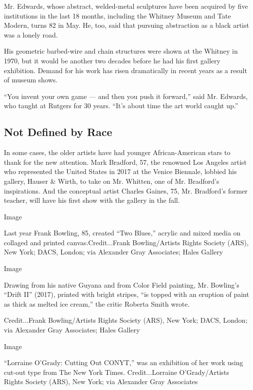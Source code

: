 Mr. Edwards, whose abstract, welded-metal sculptures have been acquired
by five institutions in the last 18 months, including the Whitney Museum
and Tate Modern, turns 82 in May. He, too, said that pursuing
abstraction as a black artist was a lonely road.

His geometric barbed-wire and chain structures were shown at the Whitney
in 1970, but it would be another two decades before he had his first
gallery exhibition. Demand for his work has risen dramatically in recent
years as a result of museum shows.

``You invent your own game --- and then you push it forward,'' said Mr.
Edwards, who taught at Rutgers for 30 years. ``It's about time the art
world caught up.''

\hypertarget{not-defined-by-race}{%
\subsection{Not Defined by Race}\label{not-defined-by-race}}

In some cases, the older artists have had younger African-American stars
to thank for the new attention. Mark Bradford, 57, the renowned Los
Angeles artist who represented the United States in 2017 at the Venice
Biennale, lobbied his gallery, Hauser \& Wirth, to take on Mr. Whitten,
one of Mr. Bradford's inspirations. And the conceptual artist Charles
Gaines, 75, Mr. Bradford's former teacher, will have his first show with
the gallery in the fall.

Image

Last year Frank Bowling, 85, created ``Two Blues,'' acrylic and mixed
media on collaged and printed canvas.Credit...Frank Bowling/Artists
Rights Society (ARS), New York; DACS, London; via Alexander Gray
Associates; Hales Gallery

Image

Drawing from his native Guyana and from Color Field painting, Mr.
Bowling's ``Drift II'' (2017), printed with bright stripes, ``is topped
with an eruption of paint as thick as melted ice cream,'' the critic
Roberta Smith wrote.

Credit...Frank Bowling/Artists Rights Society (ARS), New York; DACS,
London; via Alexander Gray Associates; Hales Gallery

Image

``Lorraine O'Grady: Cutting Out CONYT,'' was an exhibition of her work
using cut-out type from The New York Times. Credit...Lorraine
O'Grady/Artists Rights Society (ARS), New York; via Alexander Gray
Associates


